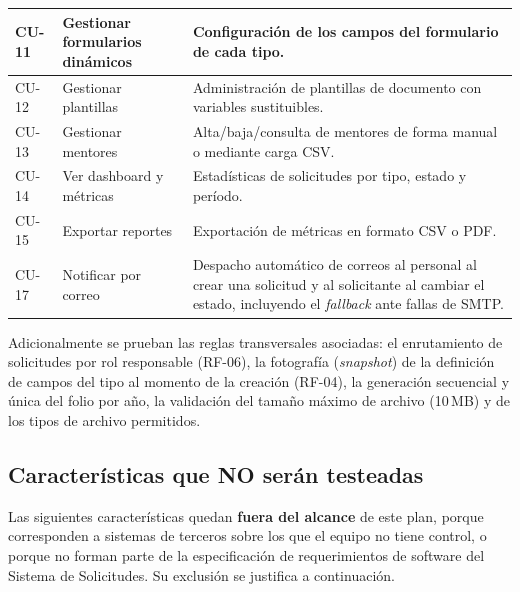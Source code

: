 \documentclass[12pt,letterpaper]{report}
\begin{document}
\begin{center}
\begin{tabularx}{\textwidth}{|C{1.6cm}|L{4.6cm}|X|}
\hline
CU-11 & Gestionar formularios dinámicos & Configuración de los campos del
formulario de cada tipo. \\
\hline
CU-12 & Gestionar plantillas & Administración de plantillas de documento con
variables sustituibles. \\
\hline
CU-13 & Gestionar mentores & Alta/baja/consulta de mentores de forma manual o
mediante carga CSV. \\
\hline
CU-14 & Ver dashboard y métricas & Estadísticas de solicitudes por tipo, estado
y período. \\
\hline
CU-15 & Exportar reportes & Exportación de métricas en formato CSV o PDF. \\
\hline
CU-17 & Notificar por correo & Despacho automático de correos al personal al
crear una solicitud y al solicitante al cambiar el estado, incluyendo el
\emph{fallback} ante fallas de SMTP. \\
\hline
\end{tabularx}
\end{center}

Adicionalmente se prueban las reglas transversales asociadas: el enrutamiento de
solicitudes por rol responsable (RF-06), la fotografía (\emph{snapshot}) de la
definición de campos del tipo al momento de la creación (RF-04), la generación
secuencial y única del folio por año, la validación del tamaño máximo de archivo
(10\,MB) y de los tipos de archivo permitidos.

\subsection{Características que NO serán testeadas}

Las siguientes características quedan \textbf{fuera del alcance} de este plan,
porque corresponden a sistemas de terceros sobre los que el equipo no tiene
control, o porque no forman parte de la especificación de requerimientos de
software del Sistema de Solicitudes. Su exclusión se justifica a continuación.
\end{document}
